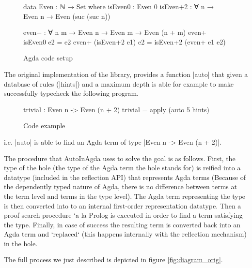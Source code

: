 \documentclass[a4paper]{article}
\begin{document}
\begin{figure}[h]
\begin{code}
 data Even  : ℕ →  Set where
    isEven0  : Even 0
    isEven+2 : ∀ {n} → Even n → Even (suc (suc n))

  even+ : ∀ {n m} → Even n → Even m → Even (n + m)
  even+  isEven0      e2 = e2
  even+ (isEven+2 e1) e2 = isEven+2 (even+ e1 e2)
\end{code}
  \caption{Agda code setup}
  \label{fig:agda_setup}
\end{figure}

The original implementation of the library, provides a function |auto| that
given a database of rules (|hints|) and a maximum depth is able for example to
make successfully typecheck the following program.

\begin{figure}[h]
\begin{code}
  trivial : Even n -> Even (n + 2)
  trivial = apply (auto 5 hints)
\end{code}
  \caption{Code example}
  \label{fig:agda_trivial}
\end{figure}

\noindent

i.e. |auto| is able to find an Agda term of type |Even n -> Even (n + 2)|.

The procedure that AutoInAgda uses to solve the goal is as follows. First, the
type of the hole (the type of the Agda term the hole stands for) is reified into
a datatype (included in the reflection API) that represents Agda terms (Because
of the dependently typed nature of Agda, there is no difference between terms at
the term level and terms in the type level). The Agda term representing the type
is then converted into to an internal first-order representation datatype. Then
a proof search procedure `a la Prolog is executed in order to find a term
satisfying the type. Finally, in case of success the resulting term is converted
back into an Agda term and `replaced` (this happens internally with the
reflection mechanism) in the hole.

The full process we just described is depicted in figure \ref{fig:diagram_orig}.
\end{document}
